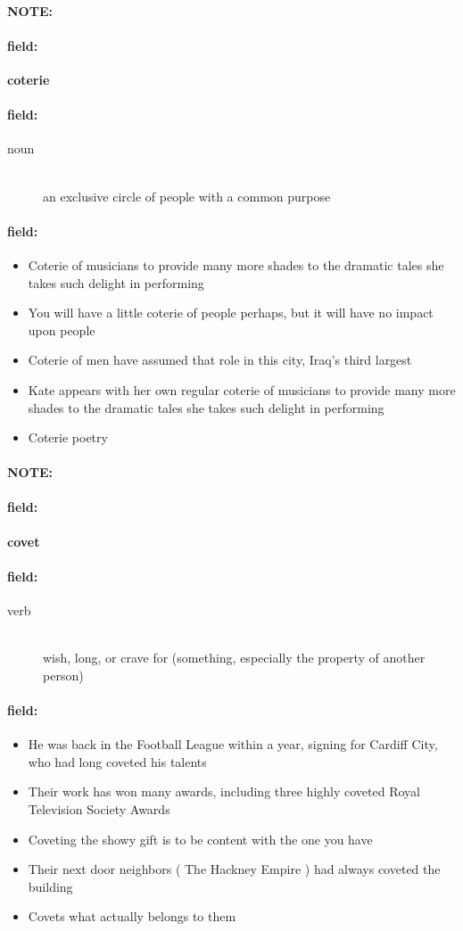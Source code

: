 \documentclass[12pt]{article}
\newenvironment{note}{\paragraph{NOTE:}}{}
\newenvironment{field}{\paragraph{field:}}{}
\begin{document}
\begin{note}
\begin{field}
\textbf{\large coterie}
\end{field}


\begin{field}
\begin{description}
\item[noun] \hfill \\ 
an exclusive circle of people with a common purpose

\end{description}
\end{field}

\begin{field}
\begin{itemize}
\item Coterie of musicians to provide many more shades to the dramatic tales she takes such delight in performing
\item You will have a little coterie of people perhaps, but it will have no impact upon people
\item Coterie of men have assumed that role in this city, Iraq's third largest
\item Kate appears with her own regular coterie of musicians to provide many more shades to the dramatic tales she takes such delight in performing
\item Coterie poetry
\end{itemize}
\end{field}
\end{note}
\begin{note}
\begin{field}
\textbf{\large covet}
\end{field}


\begin{field}
\begin{description}
\item[verb] \hfill \\ 
wish, long, or crave for (something, especially the property of another person)

\end{description}
\end{field}

\begin{field}
\begin{itemize}
\item He was back in the Football League within a year, signing for Cardiff City, who had long coveted his talents
\item Their work has won many awards, including three highly coveted Royal Television Society Awards
\item Coveting the showy gift is to be content with the one you have
\item Their next door neighbors ( The Hackney Empire ) had always coveted the building
\item Covets what actually belongs to them
\end{itemize}
\end{field}
\end{note}
\end{document}
